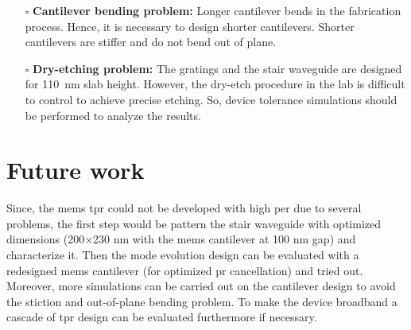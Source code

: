 \documentclass[../report.tex]{subfiles}
\begin{document}
\begin{itemize}
	\item[$\square$] \textbf{Cantilever bending problem:} Longer cantilever bends in the fabrication process. Hence,  it is necessary to design shorter cantilevers. Shorter cantilevers are stiffer and do not bend out of plane.
	
	\item[$\square$] \textbf{Dry-etching problem:} The gratings and the stair waveguide are designed for \SI{110}{\nano \meter} slab height. However, the dry-etch procedure in the lab is difficult to control to achieve precise etching. So, device tolerance simulations should be performed to analyze the results.  
	
\end{itemize}
	
	\section{Future work} 
	Since, the \gls{mems} \gls{tpr} could not be developed with high \gls{per} due to several problems, the first step would be pattern the stair waveguide with optimized dimensions (200$\times$230 nm with the \gls{mems} cantilever at 100 nm gap) and characterize it. Then the mode evolution design can be evaluated with a redesigned \gls{mems} cantilever (for optimized \gls{pr} cancellation) and tried out. Moreover, more simulations can be carried out on the cantilever design to avoid the stiction and out-of-plane bending problem. To make the device broadband a cascade of \gls{tpr} design can be evaluated furthermore if necessary. 
	
\end{document}
